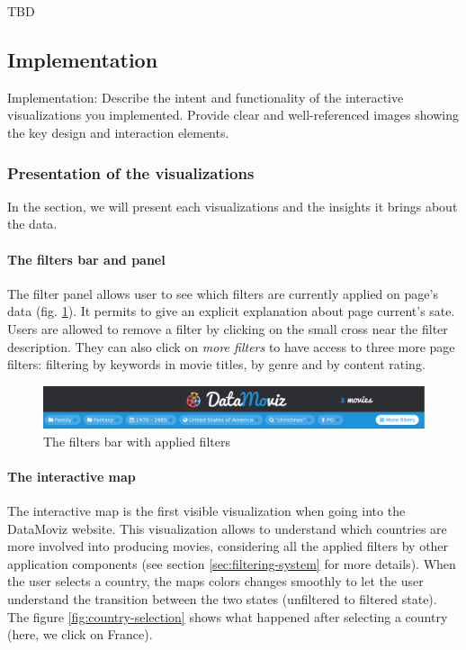 \documentclass[a4paper,10pt]{article}
\begin{document}
TBD

\subsection{Implementation}

Implementation: Describe the intent and functionality of the interactive visualizations you implemented. Provide clear and well-referenced images showing the key design and interaction elements.

\subsubsection{Presentation of the visualizations}

In the section, we will present each visualizations and the insights it brings about
the data.

\paragraph{The filters bar and panel} The filter panel allows user to see which filters are
currently applied on page's data (fig. \ref{fig:filters-bar}). It permits to give an explicit explanation about
page current's sate. Users are allowed to remove a filter by clicking on the small
cross near the filter description. They can also click on \textit{more filters} to
have access to three more page filters: filtering by keywords in movie titles,
by genre and by content rating.

\begin{figure}[ht]
  \centering
  \includegraphics[width=1\linewidth]{images/screens/filters-bar-example.png}
  \caption{The filters bar with applied filters} \label{fig:filters-bar}
\end{figure}

\paragraph{The interactive map} The interactive map is the first visible visualization
when going into the DataMoviz website. This visualization allows to understand which
countries are more involved into producing movies, considering all the applied filters
by other application components (see section \ref{sec:filtering-system} for more details).
When the user selects a country, the maps colors changes smoothly to let the user understand
the transition between the two states (unfiltered to filtered state). The figure \ref{fig:country-selection}
shows what happened after selecting a country (here, we click on France).
\end{document}
